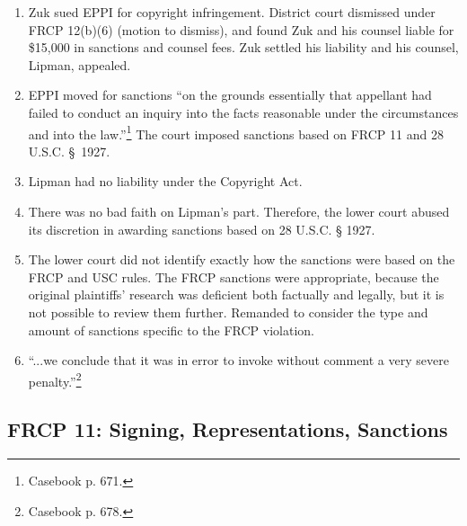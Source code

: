 \begin{enumerate}
    \item Zuk sued EPPI for copyright infringement. District court dismissed under FRCP 12(b)(6) (motion to dismiss), and found Zuk and his counsel liable for \$15,000 in sanctions and counsel fees. Zuk settled his liability and his counsel, Lipman, appealed.
    \item EPPI moved for sanctions ``on the grounds essentially that appellant had failed to conduct an inquiry into the facts reasonable under the circumstances and into the law.''\footnote{Casebook p. 671.} The court imposed sanctions based on FRCP 11 and 28 U.S.C. § 1927.
    \item Lipman had no liability under the Copyright Act.
    \item There was no bad faith on Lipman's part. Therefore, the lower court abused its discretion in awarding sanctions based on 28 U.S.C. § 1927.
    \item The lower court did not identify exactly how the sanctions were based on the FRCP and USC rules. The FRCP sanctions were appropriate, because the original plaintiffs' research was deficient both factually and legally, but it is not possible to review them further. Remanded to consider the type and amount of sanctions specific to the FRCP violation.
    \item ``...we conclude that it was in error to invoke without comment a very severe penalty.''\footnote{Casebook p. 678.}
\end{enumerate}

\subsection{FRCP 11: Signing, Representations, Sanctions}

